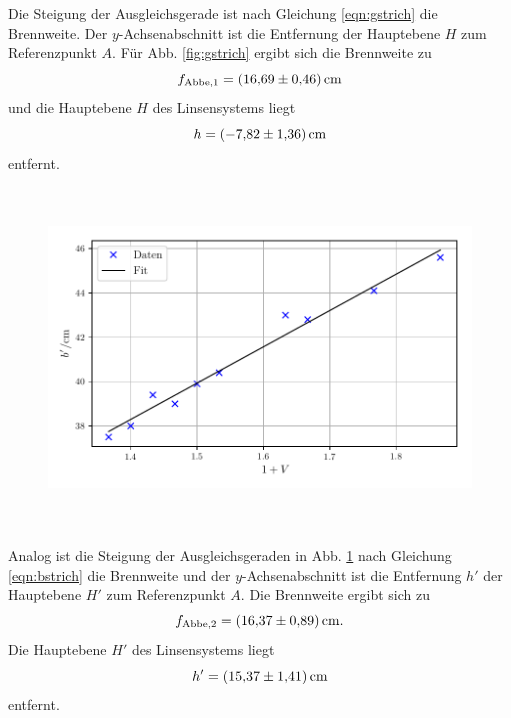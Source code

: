 \noindent Die Steigung der Ausgleichsgerade ist nach Gleichung \eqref{eqn:gstrich} die Brennweite.
Der $y$-Achsenabschnitt ist die Entfernung der Hauptebene $H$ zum Referenzpunkt $A$.
Für Abb. \ref{fig:gstrich} ergibt sich die Brennweite zu 
\begin{equation*}
    f_\text{Abbe,1} = \SI{16.69 \pm 0.46}{\centi\meter}
\end{equation*}
und die Hauptebene $H$ des Linsensystems liegt
\begin{equation*}
    h = \SI{-7.82 \pm 1.36}{\centi\meter}
\end{equation*}
entfernt.

\begin{figure}
    \centering
    \includegraphics[width=14cm, height=9cm]{build/abbe_b.pdf}
    \caption{}
    \label{fig:bstrich}
\end{figure}

\noindent Analog ist die Steigung der Ausgleichsgeraden in Abb. \ref{fig:bstrich} nach Gleichung \eqref{eqn:bstrich} die Brennweite und der $y$-Achsenabschnitt ist die Entfernung $h'$ der Hauptebene $H'$ zum Referenzpunkt $A$.
Die Brennweite ergibt sich zu 
\begin{equation*}
    f_\text{Abbe,2} = \SI{16.37 \pm 0.89}{\centi\meter}.
\end{equation*}
Die Hauptebene $H'$ des Linsensystems liegt
\begin{equation*}
    h' = \SI{15.37 \pm 1.41}{\centi\meter}
\end{equation*}
entfernt.
